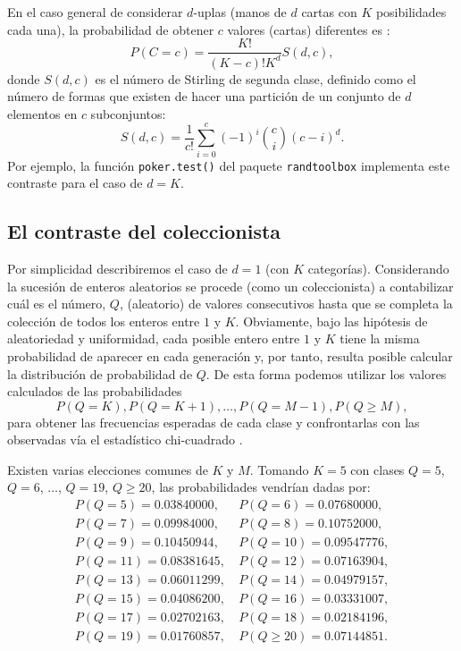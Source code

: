 \documentclass[
  spanish,
  10pt,
]{book}
\theoremstyle{break}
\theoremstyle{nonumberplain}
\begin{document}
En el caso general de considerar \(d\)-uplas (manos de \(d\) cartas con \(K\) posibilidades cada una), la probabilidad de obtener \(c\) valores (cartas) diferentes es \citep[e.g.][Sección 3.3.2, p.~64]{knuth2002}:
\[P(C=c) = \frac{K!}{(K-c)!K^d}S(d,c),\]
donde \(S(d,c)\) es el número de Stirling de segunda clase, definido como el número de formas que existen de hacer una partición de un conjunto de \(d\) elementos en \(c\) subconjuntos:
\[S(d,c) = \frac{1}{c!}\sum_{i=0}^{c} (-1)^{i} \binom{c}{i} (c-i)^d.\]
Por ejemplo, la función \texttt{poker.test()} del paquete \texttt{randtoolbox} implementa este contraste para el caso de \(d=K\).

\subsection{El contraste del coleccionista}\label{el-contraste-del-coleccionista}

Por simplicidad describiremos el caso de \(d=1\) (con \(K\) categorías).
Considerando la sucesión de enteros aleatorios se procede (como un
coleccionista) a contabilizar cuál es el número, \(Q\), (aleatorio) de
valores consecutivos hasta que se completa la colección de todos los
enteros entre \(1\) y \(K\). Obviamente, bajo las hipótesis de aleatoriedad
y uniformidad, cada posible entero entre \(1\) y
\(K\) tiene la misma probabilidad de aparecer en cada generación y, por
tanto, resulta posible calcular la distribución de probabilidad de \(Q\).
De esta forma podemos utilizar los valores calculados de las probabilidades
\[P( Q = K ), P( Q = K+1 ),\ldots, P( Q = M -1 ), P( Q \geq M ),\]
para obtener las frecuencias esperadas de cada clase y confrontarlas con las
observadas vía el estadístico chi-cuadrado \citep[e.g.][Sección 3.3.2, p.~65]{knuth2002}.

Existen varias elecciones comunes de \(K\) y \(M\).
Tomando \(K=5\) con clases \(Q=5\), \(Q=6\), \(\ldots\), \(Q=19\), \(Q\geq20\), las probabilidades vendrían dadas por:
\[\begin{array}{rr}
P( Q = 5 ) = 0.03840000, \ & P( Q = 6 ) = 0.07680000,\\
P( Q = 7 ) = 0.09984000, \ & P( Q = 8 ) = 0.10752000,\\
P( Q = 9 ) = 0.10450944, \ & P( Q = 10 ) = 0.09547776,\\
P( Q = 11 ) = 0.08381645, \ & P( Q = 12 ) = 0.07163904,\\
P( Q = 13 ) = 0.06011299, \ & P( Q = 14 ) = 0.04979157,\\
P( Q = 15 ) = 0.04086200, \ & P( Q = 16 ) = 0.03331007,\\
P( Q = 17 ) = 0.02702163, \ & P( Q = 18 ) = 0.02184196,\\
P( Q = 19 ) = 0.01760857, \ & P( Q\geq20 ) = 0.07144851.
\end{array}\]
\end{document}
